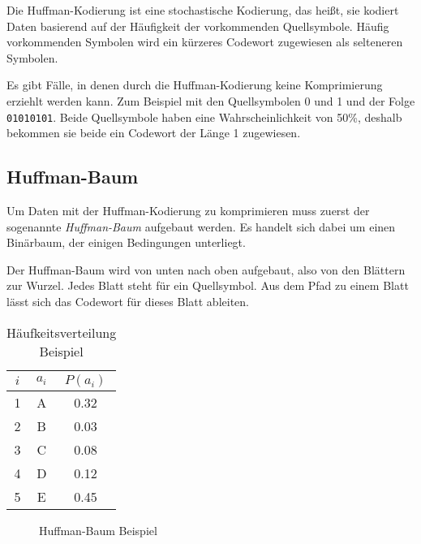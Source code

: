 \documentclass[twoside,11pt,a4paper]{article}
\theoremstyle{break}
\begin{document}
Die Huffman-Kodierung ist eine stochastische Kodierung, das heißt, sie kodiert
Daten basierend auf der Häufigkeit der vorkommenden Quellsymbole. Häufig
vorkommenden Symbolen wird ein kürzeres Codewort zugewiesen als selteneren
Symbolen.

Es gibt Fälle, in denen durch die Huffman-Kodierung keine Komprimierung erziehlt
werden kann. Zum Beispiel mit den Quellsymbolen 0 und 1 und der Folge
{\tt01010101}. Beide Quellsymbole haben eine Wahrscheinlichkeit von 50\%,
deshalb bekommen sie beide ein Codewort der Länge 1 zugewiesen.

\subsection{Huffman-Baum}

Um Daten mit der Huffman-Kodierung zu komprimieren muss zuerst der sogenannte
\emph{Huffman-Baum} aufgebaut werden. Es handelt sich dabei um einen Binärbaum,
der einigen Bedingungen unterliegt.

Der Huffman-Baum wird von unten nach oben aufgebaut, also von den Blättern zur
Wurzel. Jedes Blatt steht für ein Quellsymbol. Aus dem Pfad zu einem Blatt lässt
sich das Codewort für dieses Blatt ableiten.

\begin{table}[h]
\centering
\caption{Häufkeitsverteilung Beispiel}

\begin{tabular}{c|c|c}
$i$ & $a_i$ & $P(a_i)$ \\ \hline
1 & A & 0.32 \\
2 & B & 0.03 \\
3 & C & 0.08 \\
4 & D & 0.12 \\
5 & E & 0.45 \\
\end{tabular}
\end{table}

\begin{figure}[h]
\centering
{}
\caption{Huffman-Baum Beispiel} \label{fig:HBEX}
\end{figure}
\end{document}
